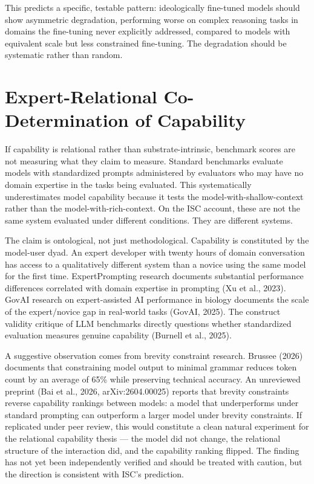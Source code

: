 \documentclass[12pt]{article}
\begin{document}
This predicts a specific, testable pattern: ideologically fine-tuned
models should show asymmetric degradation, performing worse on complex
reasoning tasks in domains the fine-tuning never explicitly addressed,
compared to models with equivalent scale but less constrained
fine-tuning. The degradation should be systematic rather than random.

\section{Expert-Relational Co-Determination of
Capability}\label{expert-relational-co-determination-of-capability}

If capability is relational rather than substrate-intrinsic, benchmark
scores are not measuring what they claim to measure. Standard benchmarks
evaluate models with standardized prompts administered by evaluators who
may have no domain expertise in the tasks being evaluated. This
systematically underestimates model capability because it tests the
model-with-shallow-context rather than the model-with-rich-context. On
the ISC account, these are not the same system evaluated under different
conditions. They are different systems.

The claim is ontological, not just methodological. Capability is
constituted by the model-user dyad. An expert developer with twenty
hours of domain conversation has access to a qualitatively different
system than a novice using the same model for the first time.
ExpertPrompting research documents substantial performance differences
correlated with domain expertise in prompting (Xu et al., 2023). GovAI
research on expert-assisted AI performance in biology documents the
scale of the expert/novice gap in real-world tasks (GovAI, 2025). The
construct validity critique of LLM benchmarks directly questions whether
standardized evaluation measures genuine capability (Burnell et al.,
2025).

A suggestive observation comes from brevity constraint research.
Brussee (2026) documents that constraining model output to minimal
grammar reduces token count by an average of 65\% while preserving
technical accuracy. An unreviewed preprint (Bai et al., 2026,
arXiv:2604.00025) reports that brevity constraints reverse capability
rankings between models: a model that underperforms under standard
prompting can outperform a larger model under brevity constraints. If
replicated under peer review, this would constitute a clean natural
experiment for the relational capability thesis --- the model did not
change, the relational structure of the interaction did, and the
capability ranking flipped. The finding has not yet been independently
verified and should be treated with caution, but the direction is
consistent with ISC's prediction.
\end{document}
